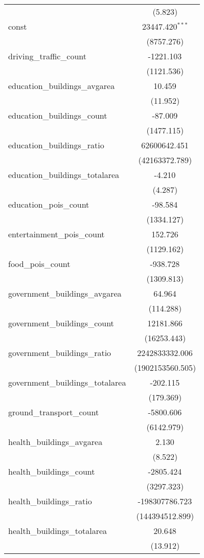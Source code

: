 \begin{table}[!htbp]
\begin{tabular}{@{\extracolsep{5pt}}lc}
  & (5.823) \\
 const & 23447.420$^{***}$ \\
  & (8757.276) \\
 driving_traffic_count & -1221.103$^{}$ \\
  & (1121.536) \\
 education_buildings_avgarea & 10.459$^{}$ \\
  & (11.952) \\
 education_buildings_count & -87.009$^{}$ \\
  & (1477.115) \\
 education_buildings_ratio & 62600642.451$^{}$ \\
  & (42163372.789) \\
 education_buildings_totalarea & -4.210$^{}$ \\
  & (4.287) \\
 education_pois_count & -98.584$^{}$ \\
  & (1334.127) \\
 entertainment_pois_count & 152.726$^{}$ \\
  & (1129.162) \\
 food_pois_count & -938.728$^{}$ \\
  & (1309.813) \\
 government_buildings_avgarea & 64.964$^{}$ \\
  & (114.288) \\
 government_buildings_count & 12181.866$^{}$ \\
  & (16253.443) \\
 government_buildings_ratio & 2242833332.006$^{}$ \\
  & (1902153560.505) \\
 government_buildings_totalarea & -202.115$^{}$ \\
  & (179.369) \\
 ground_transport_count & -5800.606$^{}$ \\
  & (6142.979) \\
 health_buildings_avgarea & 2.130$^{}$ \\
  & (8.522) \\
 health_buildings_count & -2805.424$^{}$ \\
  & (3297.323) \\
 health_buildings_ratio & -198307786.723$^{}$ \\
  & (144394512.899) \\
 health_buildings_totalarea & 20.648$^{}$ \\
  & (13.912) \\

\end{tabular}
\end{table}
